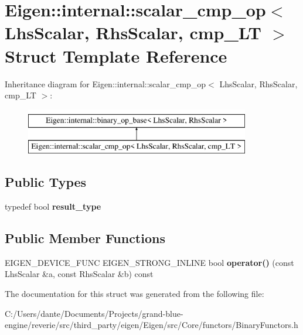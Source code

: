\hypertarget{struct_eigen_1_1internal_1_1scalar__cmp__op_3_01_lhs_scalar_00_01_rhs_scalar_00_01cmp___l_t_01_4}{}\section{Eigen\+::internal\+::scalar\+\_\+cmp\+\_\+op$<$ Lhs\+Scalar, Rhs\+Scalar, cmp\+\_\+\+LT $>$ Struct Template Reference}
\label{struct_eigen_1_1internal_1_1scalar__cmp__op_3_01_lhs_scalar_00_01_rhs_scalar_00_01cmp___l_t_01_4}
Inheritance diagram for Eigen\+::internal\+::scalar\+\_\+cmp\+\_\+op$<$ Lhs\+Scalar, Rhs\+Scalar, cmp\+\_\+\+LT $>$\+:\begin{figure}[H]
\begin{center}
\leavevmode
\includegraphics[height=2.000000cm]{struct_eigen_1_1internal_1_1scalar__cmp__op_3_01_lhs_scalar_00_01_rhs_scalar_00_01cmp___l_t_01_4}
\end{center}
\end{figure}
\subsection*{Public Types}
\begin{DoxyCompactItemize}
\item 
\mbox{\label{struct_eigen_1_1internal_1_1scalar__cmp__op_3_01_lhs_scalar_00_01_rhs_scalar_00_01cmp___l_t_01_4_ac4efa58fb332594216a4176ee783cda7}} 
typedef bool {\bfseries result\+\_\+type}
\end{DoxyCompactItemize}
\subsection*{Public Member Functions}
\begin{DoxyCompactItemize}
\item 
\mbox{\label{struct_eigen_1_1internal_1_1scalar__cmp__op_3_01_lhs_scalar_00_01_rhs_scalar_00_01cmp___l_t_01_4_af196a5720aba4bafc0681d66be2061f6}} 
E\+I\+G\+E\+N\+\_\+\+D\+E\+V\+I\+C\+E\+\_\+\+F\+U\+NC E\+I\+G\+E\+N\+\_\+\+S\+T\+R\+O\+N\+G\+\_\+\+I\+N\+L\+I\+NE bool {\bfseries operator()} (const Lhs\+Scalar \&a, const Rhs\+Scalar \&b) const
\end{DoxyCompactItemize}


The documentation for this struct was generated from the following file\+:\begin{DoxyCompactItemize}
\item 
C\+:/\+Users/dante/\+Documents/\+Projects/grand-\/blue-\/engine/reverie/src/third\+\_\+party/eigen/\+Eigen/src/\+Core/functors/Binary\+Functors.\+h\end{DoxyCompactItemize}
